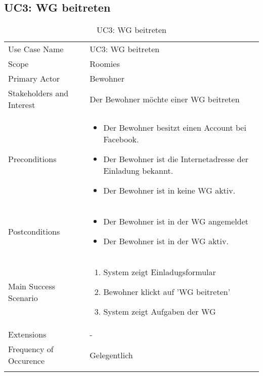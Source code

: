 \subsection{UC3: WG beitreten}
\begin{table}[H]
	\tablestyle
	\tablealtcolored
	\begin{tabularx}{\textwidth}{lX}
		\tablebody
			Use Case Name &
			UC3: WG beitreten
			\tabularnewline
			Scope &
			Roomies
			\tabularnewline
			Primary Actor &
			Bewohner
			\tabularnewline
			Stakeholders and Interest &
			Der Bewohner möchte einer WG beitreten
			\tabularnewline
			Preconditions &
			\begin{itemize}
				\item Der Bewohner besitzt einen Account bei Facebook.
				\item Der Bewohner ist die Internetadresse der Einladung bekannt.
				\item Der Bewohner ist in keine WG aktiv.
			\end{itemize}
			\tabularnewline
			Postconditions &
			\begin{itemize}
				\item Der Bewohner ist in der WG angemeldet
				\item Der Bewohner ist in der WG aktiv.
			\end{itemize}
			\tabularnewline
			Main Success Scenario &
			\begin{enumerate}
				\item System zeigt Einladugsformular
				\item Bewohner klickt auf 'WG beitreten'
				\item System zeigt Aufgaben der WG
			\end{enumerate}
			\tabularnewline
			Extensions &
			-
			\tabularnewline
			Frequency of Occurence &
			Gelegentlich
			\tabularnewline
		\tableend
	\end{tabularx}
	\caption{UC3: WG beitreten}
\end{table}


